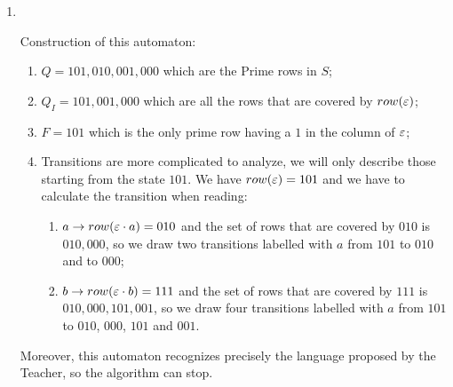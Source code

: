 \begin{enumerate}
  \item \begin{minipage}{0.3\textwidth}
          
        \end{minipage}\quad\\
        \begin{minipage}{1\textwidth}
          Construction of this automaton:
          \begin{enumerate}
            \item $Q = {101,010,001,000}$ which are the Prime rows in $S$;
            \item $Q_I = {101,001,000}$ which are all the rows that are covered by $row(\varepsilon)$;
            \item $F = {101}$ which is the only prime row having a $1$ in the column of $\varepsilon$;
            \item Transitions are more complicated to analyze, we will only describe those starting from the state $101$. We have $row(\varepsilon) = 101$ and we have to calculate the transition when reading:
                  \begin{enumerate}
                    \item $a \rightarrow row(\varepsilon \cdot a) = 010$ and the set of rows that are covered by $010$ is ${010, 000}$, so we draw two transitions labelled with $a$ from $101$ to $010$ and to $000$;
                    \item $b \rightarrow row(\varepsilon \cdot b) = 111$ and the set of rows that are covered by $111$ is ${010, 000, 101, 001}$, so we draw four transitions labelled with $a$ from $101$ to $010$, $000$, $101$ and $001$.
                  \end{enumerate}
          \end{enumerate}
          Moreover, this automaton recognizes precisely the language proposed by the Teacher, so the algorithm can stop.
        \end{minipage}
\end{enumerate}